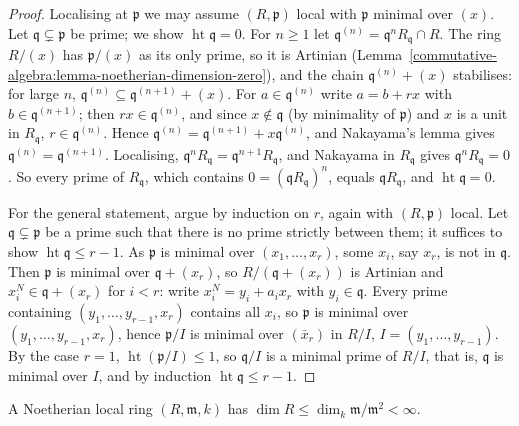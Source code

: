 \begin{proof}
Localising at $\mathfrak{p}$ we may assume $(R, \mathfrak{p})$ local with $\mathfrak{p}$ minimal over $(x)$. Let $\mathfrak{q} \subsetneq \mathfrak{p}$ be prime; we show
$\operatorname{ht}\mathfrak{q} = 0$. For $n \geq 1$ let $\mathfrak{q}^{(n)} = \mathfrak{q}^nR_\mathfrak{q} \cap R$. The ring $R/(x)$ has $\mathfrak{p}/(x)$ as its only prime, so it
is Artinian (Lemma~\ref{commutative-algebra:lemma-noetherian-dimension-zero}), and the chain $\mathfrak{q}^{(n)} + (x)$ stabilises: for large
$n$, $\mathfrak{q}^{(n)} \subseteq \mathfrak{q}^{(n+1)} + (x)$. For $a \in \mathfrak{q}^{(n)}$ write $a = b + rx$ with $b \in \mathfrak{q}^{(n+1)}$; then
$rx \in \mathfrak{q}^{(n)}$, and since $x \notin \mathfrak{q}$ (by minimality of $\mathfrak{p}$) and $x$ is a unit in $R_\mathfrak{q}$, $r \in \mathfrak{q}^{(n)}$. Hence
$\mathfrak{q}^{(n)} = \mathfrak{q}^{(n+1)} + x\mathfrak{q}^{(n)}$, and Nakayama's lemma gives $\mathfrak{q}^{(n)} = \mathfrak{q}^{(n+1)}$. Localising,
$\mathfrak{q}^nR_\mathfrak{q} = \mathfrak{q}^{n+1}R_\mathfrak{q}$, and Nakayama in $R_\mathfrak{q}$ gives $\mathfrak{q}^nR_\mathfrak{q} = 0$. So every prime of $R_\mathfrak{q}$, which
contains $0 = (\mathfrak{q}R_\mathfrak{q})^n$, equals $\mathfrak{q}R_\mathfrak{q}$, and $\operatorname{ht}\mathfrak{q} = 0$.

For the general statement, argue by induction on $r$, again with $(R, \mathfrak{p})$ local. Let $\mathfrak{q} \subsetneq \mathfrak{p}$ be a prime such that
there is no prime strictly between them; it suffices to show $\operatorname{ht}\mathfrak{q} \leq r - 1$. As $\mathfrak{p}$ is minimal over $(x_1, \ldots, x_r)$,
some $x_i$, say $x_r$, is not in $\mathfrak{q}$. Then $\mathfrak{p}$ is minimal over $\mathfrak{q} + (x_r)$, so $R/(\mathfrak{q} + (x_r))$ is Artinian and
$x_i^N \in \mathfrak{q} + (x_r)$ for $i < r$: write $x_i^N = y_i + a_ix_r$ with $y_i \in \mathfrak{q}$. Every prime containing
$(y_1, \ldots, y_{r-1}, x_r)$ contains all $x_i$, so $\mathfrak{p}$ is minimal over $(y_1, \ldots, y_{r-1}, x_r)$, hence $\mathfrak{p}/I$ is minimal
over $(\bar x_r)$ in $R/I$, $I = (y_1, \ldots, y_{r-1})$. By the case $r = 1$, $\operatorname{ht}(\mathfrak{p}/I) \leq 1$, so $\mathfrak{q}/I$ is a minimal prime of
$R/I$, that is, $\mathfrak{q}$ is minimal over $I$, and by induction $\operatorname{ht}\mathfrak{q} \leq r - 1$.
\end{proof}

\begin{corollary}\label{commutative-algebra:corollary-local-dimension-finite}
A Noetherian local ring $(R, \mathfrak{m}, k)$ has $\dim R \leq \dim_k \mathfrak{m}/\mathfrak{m}^2 < \infty$.
\end{corollary}

